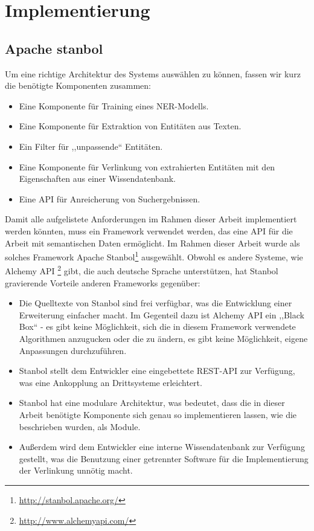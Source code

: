 \chapter{Implementierung}
\label{sec:Implementierung}

\section{Apache stanbol}
Um eine richtige Architektur des Systems auswählen zu können, fassen wir kurz die benötigte Komponenten zusammen:
\begin{itemize}
\item Eine Komponente für Training eines NER-Modells.
\item Eine Komponente für Extraktion von Entitäten aus Texten.
\item Ein Filter für ,,unpassende`` Entitäten.
\item Eine Komponente für Verlinkung von extrahierten Entitäten mit den Eigenschaften aus einer Wissendatenbank.
\item Eine API für Anreicherung von Suchergebnissen.
\end{itemize}

Damit alle aufgelistete Anforderungen im Rahmen dieser Arbeit implementiert werden könnten, muss ein Framework verwendet werden, das eine API für die Arbeit mit semantischen Daten ermöglicht. Im Rahmen dieser Arbeit wurde als solches Framework Apache Stanbol\footnote{\url{http://stanbol.apache.org/}} ausgewählt. Obwohl es andere Systeme, wie Alchemy API \footnote{\url{http://www.alchemyapi.com/}} gibt, die auch deutsche Sprache unterstützen, hat Stanbol gravierende Vorteile anderen Frameworks gegenüber:
\begin{itemize}
\item Die Quelltexte von Stanbol sind frei verfügbar, was die Entwicklung einer Erweiterung einfacher macht. Im Gegenteil dazu ist Alchemy API ein ,,Black Box`` - es gibt keine Möglichkeit, sich die in diesem Framework verwendete Algorithmen anzugucken oder die zu ändern, es gibt keine Möglichkeit, eigene Anpassungen durchzuführen.
\item Stanbol stellt dem Entwickler eine eingebettete REST-API zur Verfügung, was eine Ankopplung an Drittsysteme erleichtert.
\item Stanbol hat eine modulare Architektur, was bedeutet, dass die in dieser Arbeit benötigte Komponente sich genau so implementieren lassen, wie die beschrieben wurden, als Module.
\item Außerdem wird dem Entwickler eine interne Wissendatenbank zur Verfügung gestellt, was die Benutzung einer getrennter Software für die Implementierung der Verlinkung unnötig macht. 
\end{itemize}


